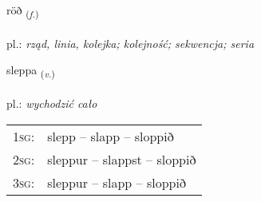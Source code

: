 \documentclass[frontgrid, backgrid]{flacards}\usepackage[]{graphicx}\usepackage[]{xcolor}
\begin{document}
\renewcommand{\flhead}{\vskip5pt \fboxsep=0pt {\small\bfseries\footnotesize Nafnorð | rzeczownik}}
\renewcommand{\fcfoot}{\vskip5pt \fboxsep=0pt \hspace{2pt}{\small\bfseries\footnotesize 1K}}

\renewcommand{\blhead}{\vskip5pt {\small\bfseries\footnotesize Nafnorð | rzeczownik }}
\renewcommand{\bcfoot}{\vskip5pt \hspace{2pt}{\small\bfseries\footnotesize 1K}}


{röð \small{\textsubscript{(\textit{f.})}} \\[1ex] %
\textphonetic{[rœːð]} \\
pl.: \emph{rząd, linia, kolejka; kolejność; sekwencja; seria} \\  [2ex]
\renewcommand*{\arraystretch}{0.8}
}

\renewcommand{\flhead}{\vskip5pt \fboxsep=0pt {\small\bfseries\footnotesize Sagnorð | czasownik}}
\renewcommand{\fcfoot}{\vskip5pt \fboxsep=0pt \hspace{2pt}{\small\bfseries\footnotesize 1K}}

\renewcommand{\blhead}{\vskip5pt {\small\bfseries\footnotesize Sagnorð | czasownik }}
\renewcommand{\bcfoot}{\vskip5pt \hspace{2pt}{\small\bfseries\footnotesize 1K}}


{sleppa \small{\textsubscript{(\textit{v.})}} \\[1ex] %
\textphonetic{[stlɛhpa]} \\
pl.: \emph{wychodzić cało} \\  [2ex]
\renewcommand*{\arraystretch}{0.8}
\begin{tabular}{p{1cm}l}
\textsc{1sg}: & slepp -- slapp -- sloppið \\ 
\textsc{2sg}: & sleppur -- slappst -- sloppið \\ 
\textsc{3sg}: & sleppur -- slapp -- sloppið \\ 
\end{tabular}
}
\end{document}
